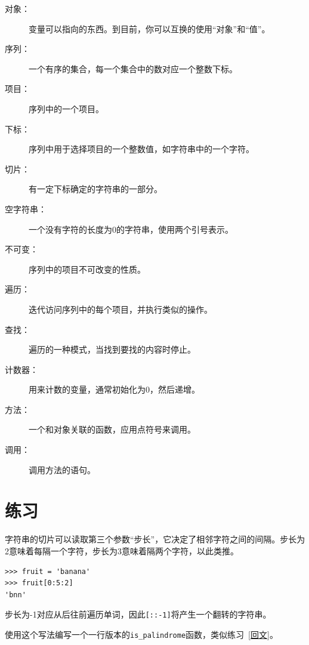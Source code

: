 \begin{description}

\item[对象：] 变量可以指向的东西。到目前，你可以互换的使用“对象”和“值”。

\item[序列：] 一个有序的集合，每一个集合中的数对应一个整数下标。

\item[项目：] 序列中的一个项目。

\item[下标：] 序列中用于选择项目的一个整数值，如字符串中的一个字符。

\item[切片：] 有一定下标确定的字符串的一部分。

\item[空字符串：] 一个没有字符的长度为0的字符串，使用两个引号表示。

\item[不可变：] 序列中的项目不可改变的性质。

\item[遍历：] 迭代访问序列中的每个项目，并执行类似的操作。

\item[查找：] 遍历的一种模式，当找到要找的内容时停止。

\item[计数器：] 用来计数的变量，通常初始化为0，然后递增。

\item[方法：] 一个和对象关联的函数，应用点符号来调用。

\item[调用：] 调用方法的语句。

\end{description}


\section{练习}

\begin{ex}


字符串的切片可以读取第三个参数“步长”，它决定了相邻字符之间的间隔。步长为2意味着每隔一个字符，步长为3意味着隔两个字符，以此类推。

\beforeverb
\begin{verbatim}
>>> fruit = 'banana'
>>> fruit[0:5:2]
'bnn'
\end{verbatim}
\afterverb

步长为-1对应从后往前遍历单词，因此\verb"[::-1]"将产生一个翻转的字符串。


使用这个写法编写一个一行版本的\verb"is_palindrome"函数，类似练习~\ref{回文}。
\end{ex}


